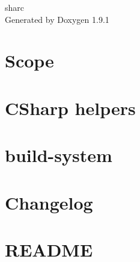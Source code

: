 \let\mypdfximage\pdfximage\def\pdfximage{\immediate\mypdfximage}\documentclass[twoside]{book}
\newcommand{\+}{\discretionary{\mbox{\scriptsize$\hookleftarrow$}}{}{}}
\newcommand{\clearemptydoublepage}{%
  \newpage{\pagestyle{empty}\cleardoublepage}%
}
\begin{document}
\raggedbottom

\hypersetup{pageanchor=false,
             bookmarksnumbered=true,
             pdfencoding=unicode
            }
\begin{titlepage}
\vspace*{7cm}
\begin{center}%
{\Large sharc }\\
\vspace*{1cm}
{\large Generated by Doxygen 1.9.1}\\
\end{center}
\end{titlepage}
\clearemptydoublepage
{}
\tableofcontents
\clearemptydoublepage
{}
\hypersetup{pageanchor=true}

\chapter{Scope}
\label{md__work_gratienj_Projets_2026_sharc_AGENTS}

\chapter{CSharp helpers}
\label{md__work_gratienj_Projets_2026_sharc_common_ArcaneInfra_build_system_csharp_README}

\chapter{build-\/system}
\label{md__work_gratienj_Projets_2026_sharc_common_ArcaneInfra_build_system_README}

\chapter{Changelog}
\label{md__work_gratienj_Projets_2026_sharc_common_ArcGeoSim_changelog}

\chapter{README}
\label{md__work_gratienj_Projets_2026_sharc_README}

\end{document}
